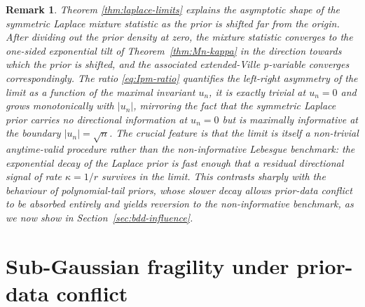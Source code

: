 \documentclass{article}%
\newtheorem{remark}[theorem]{Remark}
\newcommand{\1}{\mathbf{1}}
\begin{document}
\begin{remark}
Theorem \ref{thm:laplace-limits} explains the asymptotic shape of the symmetric Laplace mixture statistic as the prior is shifted far from the origin. After dividing out the prior density at zero, the mixture statistic converges to the one-sided exponential tilt of Theorem~\ref{thm:Mn-kappa} in the direction towards which the prior is shifted, and the associated extended-Ville p-variable converges correspondingly. The ratio \eqref{eq:Ipm-ratio} quantifies the left-right asymmetry of the limit as a function of the maximal invariant $u_n$, it is exactly trivial at $u_n=0$ and grows monotonically with $|u_n|$, mirroring the fact that the symmetric Laplace prior carries no directional information at $u_n=0$ but is maximally informative at the boundary $|u_n|=\sqrt n$. The crucial feature is that the limit is itself a non-trivial anytime-valid procedure rather than the non-informative Lebesgue benchmark: the exponential decay of the Laplace prior is fast enough that a residual directional signal of rate $\kappa = 1/r$ survives in the limit. This contrasts sharply with the behaviour of polynomial-tail priors, whose slower decay allows prior-data conflict to be absorbed entirely and yields reversion to the non-informative benchmark, as we now show in Section~\ref{sec:bdd-influence}.
\end{remark}



\section{Sub-Gaussian fragility under prior-data conflict}
\end{document}

